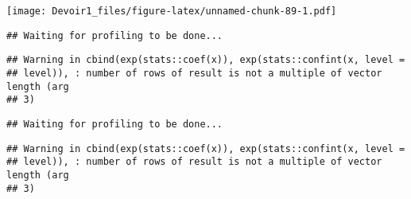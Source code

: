 \documentclass[]{article}
\newenvironment{Shaded}{\begin{snugshade}}{\end{snugshade}}
\newcommand{\KeywordTok}[1]{\textcolor[rgb]{0.13,0.29,0.53}{\textbf{#1}}}
\newcommand{\DataTypeTok}[1]{\textcolor[rgb]{0.13,0.29,0.53}{#1}}
\newcommand{\DecValTok}[1]{\textcolor[rgb]{0.00,0.00,0.81}{#1}}
\newcommand{\StringTok}[1]{\textcolor[rgb]{0.31,0.60,0.02}{#1}}
\newcommand{\OperatorTok}[1]{\textcolor[rgb]{0.81,0.36,0.00}{\textbf{#1}}}
\newcommand{\NormalTok}[1]{#1}
\begin{document}
\texttt{[image: Devoir1\_files/figure-latex/unnamed-chunk-89-1.pdf]}

\begin{Shaded}
\end{Shaded}

\begin{verbatim}
## Waiting for profiling to be done...
\end{verbatim}

\begin{verbatim}
## Warning in cbind(exp(stats::coef(x)), exp(stats::confint(x, level =
## level)), : number of rows of result is not a multiple of vector length (arg
## 3)
\end{verbatim}

\begin{verbatim}
## Waiting for profiling to be done...
\end{verbatim}

\begin{verbatim}
## Warning in cbind(exp(stats::coef(x)), exp(stats::confint(x, level =
## level)), : number of rows of result is not a multiple of vector length (arg
## 3)
\end{verbatim}
\end{document}
